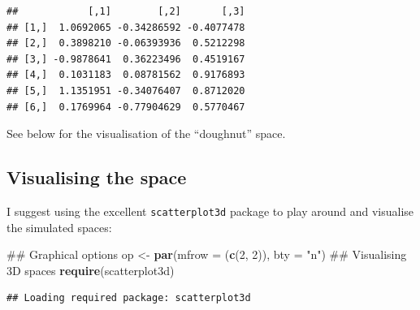 \documentclass[]{book}
\newenvironment{Shaded}{\begin{snugshade}}{\end{snugshade}}
\newcommand{\KeywordTok}[1]{\textcolor[rgb]{0.13,0.29,0.53}{\textbf{#1}}}
\newcommand{\DataTypeTok}[1]{\textcolor[rgb]{0.13,0.29,0.53}{#1}}
\newcommand{\DecValTok}[1]{\textcolor[rgb]{0.00,0.00,0.81}{#1}}
\newcommand{\StringTok}[1]{\textcolor[rgb]{0.31,0.60,0.02}{#1}}
\newcommand{\NormalTok}[1]{#1}
\theoremstyle{definition}
\theoremstyle{definition}
\theoremstyle{remark}
\begin{document}
\begin{verbatim}
##            [,1]        [,2]       [,3]
## [1,]  1.0692065 -0.34286592 -0.4077478
## [2,]  0.3898210 -0.06393936  0.5212298
## [3,] -0.9878641  0.36223496  0.4519167
## [4,]  0.1031183  0.08781562  0.9176893
## [5,]  1.1351951 -0.34076407  0.8712020
## [6,]  0.1769964 -0.77904629  0.5770467
\end{verbatim}

See below for the visualisation of the ``doughnut'' space.

\subsection{Visualising the space}\label{visualising-the-space}

I suggest using the excellent \texttt{scatterplot3d} package to play
around and visualise the simulated spaces:

\begin{Shaded}
\begin{Highlighting}[]
\NormalTok{## Graphical options}
\NormalTok{op <-}\StringTok{ }\KeywordTok{par}\NormalTok{(}\DataTypeTok{mfrow =}\NormalTok{ (}\KeywordTok{c}\NormalTok{(}\DecValTok{2}\NormalTok{, }\DecValTok{2}\NormalTok{)), }\DataTypeTok{bty =} \StringTok{"n"}\NormalTok{)}
\NormalTok{## Visualising 3D spaces}
\KeywordTok{require}\NormalTok{(scatterplot3d)}
\end{Highlighting}
\end{Shaded}

\begin{verbatim}
## Loading required package: scatterplot3d
\end{verbatim}
\end{document}
